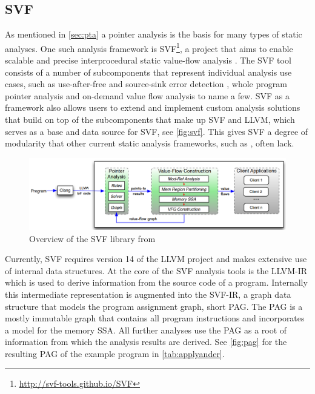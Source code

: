 \subsection{SVF}\label{sec:svf}
As mentioned in \autoref{sec:pta} a pointer analysis is the basis for many types of static analyses.
One such analysis framework is SVF\footnote{\url{http://svf-tools.github.io/SVF}}, a project that aims to enable scalable and precise interprocedural static value-flow analysis \cite{sui2016svf}. The SVF tool consists of a number of subcomponents that represent individual analysis use cases, such as use-after-free and source-sink error detection \cite{sui2014detecting}, whole program pointer analysis and on-demand value flow analysis \cite{sui2018value} to name a few.
SVF as a framework also allows users to extend and implement custom analysis solutions that build on top of the subcomponents that make up SVF and LLVM, which serves as a base and data source for SVF, see \autoref{fig:svf}.
This gives SVF a degree of modularity that other current static analysis frameworks, such as \cite{shi2018pinpoint}, often lack.

\begin{figure}
    \centering
    \includegraphics[width=1.\textwidth]{img/svf.png}
    \caption[Overview of the SVF library]{Overview of the SVF library from \cite{sui2016svf}}
    \label{fig:svf}
\end{figure}

Currently, SVF requires version 14 of the LLVM project and makes extensive use of internal data structures.
At the core of the SVF analysis tools is the LLVM-IR which is used to derive information from the source code of a program. Internally this intermediate representation is augmented into the SVF-IR, a graph data structure that models the program assignment graph, short PAG. The PAG is a mostly immutable graph that contains all program instructions and incorporates a model for the memory SSA. All further analyses use the PAG as a root of information from which the analysis results are derived.
See \autoref{fig:pag} for the resulting PAG of the example program in \autoref{tab:applyander}.


